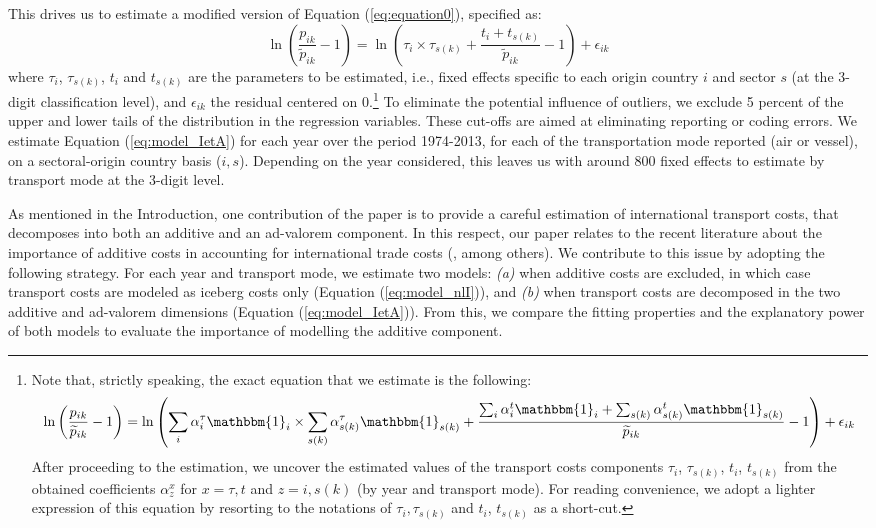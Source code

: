 \documentclass[a4paper,11pt]{article}
\begin{document}
This drives us to estimate a modified version of Equation (\ref{eq:equation0}), specified as:
\begin{equation}
\ln\left(\frac{p_{ik}}{\widetilde{p}_{ik}}-1 \right)= \ln \left(\tau_{i} \times \tau_{s(k)}+\frac{t_{i} + t_{s(k)}}{\widetilde{p}_{ik}}-1 \right) + \epsilon_{ik} \label{eq:model_IetA}
\end{equation}
where $\tau_{i}$, $\tau_{s(k)}$, $t_{i}$ and $t_{s(k)}$ are the parameters to be estimated, i.e., fixed effects specific to each origin country $i$ and sector $s$ (at the 3-digit classification level), and $\epsilon_{ik}$ the residual centered on 0.\footnote{Note that, strictly speaking, the exact equation that we estimate is the following:
$$\ln\left(\frac{p_{ik}}{\widetilde{p}_{ik}}-1 \right)= \ln \left(\sum_i \alpha_i^\tau \mathbbm{1}_i \times \sum_{s(k)}\alpha_{s(k)}^\tau \mathbbm{1}_{s(k)}+ \frac{\sum_i\alpha_i^t\mathbbm{1}_i + \sum_{s(k)}\alpha^t_{s(k)}\mathbbm{1}_{s(k)}}{\widetilde{p}_{ik}}-1\right)+\epsilon_{ik} $$
After proceeding to the estimation, we uncover the estimated values of the transport costs components $\tau_{i}$, $\tau_{s(k)}$, $t_{i}$, $t_{s(k)}$ from the obtained coefficients $\alpha^{x}_{z}$ for $x=\tau,t$ and $z=i,s(k)$ (by year and transport mode). For reading convenience, we adopt a lighter expression of this equation by resorting to the notations of $\tau_i,\tau_{s(k)}$ and $t_i$, $t_{s(k)}$ as a short-cut.}  To eliminate the potential influence of outliers, we exclude 5 percent of the upper and lower tails of the distribution in the regression variables. These cut-offs are aimed at eliminating reporting or coding errors. We estimate Equation (\ref{eq:model_IetA}) for each year over the period 1974-2013, for each of the transportation mode reported (air or vessel), on a sectoral-origin country basis ($i,s$). Depending on the year considered, this leaves us with around 800 fixed effects to estimate by transport mode at the 3-digit level.   \medskip


As mentioned in the Introduction, one contribution of the paper is to provide a careful estimation of international transport costs, that decomposes into both an additive and an ad-valorem component. In this respect, our paper relates to the recent literature about the importance of additive costs in accounting for international trade costs (\citealp{Irrazabal_2015}, among others). We contribute to this issue by adopting the following strategy. For each year and transport mode, we estimate two models: \textit{(a)} when additive costs are excluded, in which case transport costs are modeled as iceberg costs only (Equation (\ref{eq:model_nlI})), and \textit{(b)} when transport costs are decomposed in the two additive and ad-valorem dimensions (Equation (\ref{eq:model_IetA})). From this, we compare the fitting properties and the explanatory power of both models to evaluate the importance of modelling the additive component.
\end{document}
